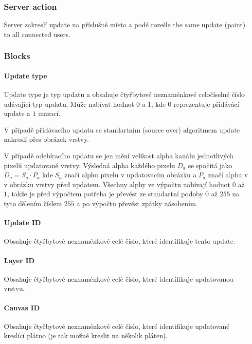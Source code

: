 \subsubsection{Server action}

Server zakreslí update na příslušné místo a podé rozešle the same update (paint) to all connected users.

\subsubsection{Blocks}

\paragraph{Update type}
Update type je typ updatu a obsahuje čtyřbytové neznaménkové celočíselné číslo udávající typ updatu. Může nabívat hodnot $0$ a $1$, kde $0$ reprezentuje přidávácí update a $1$ mazací.

V případě přidávacího updatu se standartním (source over) algoritmem update nakreslí přes obrázek vrstvy. 

V případě odebíracího updatu se jen mění velikost alpha kanálu jednotlivých pixelů updatované vrstvy. Výsledná alpha každého pixelu $D_{a}$ se spočítá jako $D_{a} = S_{a} \cdot P_{a}$ kde $S_{a}$ značí alphu pixelu v updatovacím obrázku a $P_{a}$ značí alphu v v obrázku vrstvy před updatem. Všechny alphy ve výpočtu nabívají hodnot $0$ až $1$, takže je před výpočtem potřeba je převést ze standartní podoby $0$ až $255$ na tyto dělením číslem $255$ a po výpočtu převést zpátky násobením.

\paragraph{Update ID}
Obsahuje čtyřbytové neznaménkové celé číslo, které identifikuje tento update.

\paragraph{Layer ID}
Obsahuje čtyřbytové neznaménkové celé číslo, které identifikuje updatovanou vrstvu.

\paragraph{Canvas ID}
Obsahuje čtyřbytové neznaménkové celé číslo, které identifikuje updatované kreslící plátno (je tak možné kreslit na několik pláten).

